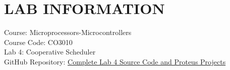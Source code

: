 \documentclass[twoside,final]{hcmut-report}
\begin{document}
\section*{LAB INFORMATION}
Course: Microprocessors-Microcontrollers \\
Course Code: CO3010 \\
Lab 4: Cooperative Scheduler \\
GitHub Repository: \href{https://github.com/TranNgocBao1/Lab4-Microprocessors-Microcontrollers}{Complete Lab 4 Source Code and Proteus Projects} \\
\end{document}
